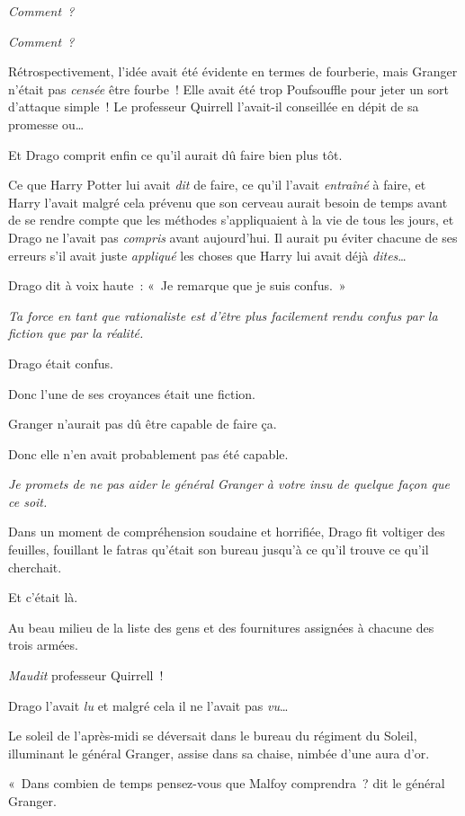 \emph{Comment~?}

\emph{Comment~?}

Rétrospectivement, l'idée avait été évidente en termes de fourberie, mais Granger n'était pas \emph{censée} être fourbe~!
Elle avait été trop Poufsouffle pour jeter un sort d'attaque simple~!
Le professeur Quirrell l'avait-il conseillée en dépit de sa promesse ou…

Et Drago comprit enfin ce qu'il aurait dû faire bien plus tôt.

Ce que Harry Potter lui avait \emph{dit} de faire, ce qu'il l'avait \emph{entraîné} à faire, et Harry l'avait malgré cela prévenu que son cerveau aurait besoin de temps avant de se rendre compte que les méthodes s'appliquaient à la vie de tous les jours, et Drago ne l'avait pas \emph{compris} avant aujourd'hui.
Il aurait pu éviter chacune de ses erreurs s'il avait juste \emph{appliqué} les choses que Harry lui avait déjà \emph{dites}…

Drago dit à voix haute~: «~Je remarque que je suis confus.~»

\emph{Ta force en tant que rationaliste est d'être plus facilement rendu confus par la fiction que par la réalité.}

Drago était confus.

Donc l'une de ses croyances était une fiction.

Granger n'aurait pas dû être capable de faire ça.

Donc elle n'en avait probablement pas été capable.

\emph{Je promets de ne pas aider le général Granger à votre insu de quelque façon que ce soit.}

Dans un moment de compréhension soudaine et horrifiée, Drago fit voltiger des feuilles, fouillant le fatras qu'était son bureau jusqu'à ce qu'il trouve ce qu'il cherchait.

Et c'était là.

Au beau milieu de la liste des gens et des fournitures assignées à chacune des trois armées.

\emph{Maudit} professeur Quirrell~!

Drago l'avait \emph{lu} et malgré cela il ne l'avait pas \emph{vu}…

\later

Le soleil de l'après-midi se déversait dans le bureau du régiment du Soleil, illuminant le général Granger, assise dans sa chaise, nimbée d'une aura d'or.

«~Dans combien de temps pensez-vous que Malfoy comprendra~? dit le général Granger.

